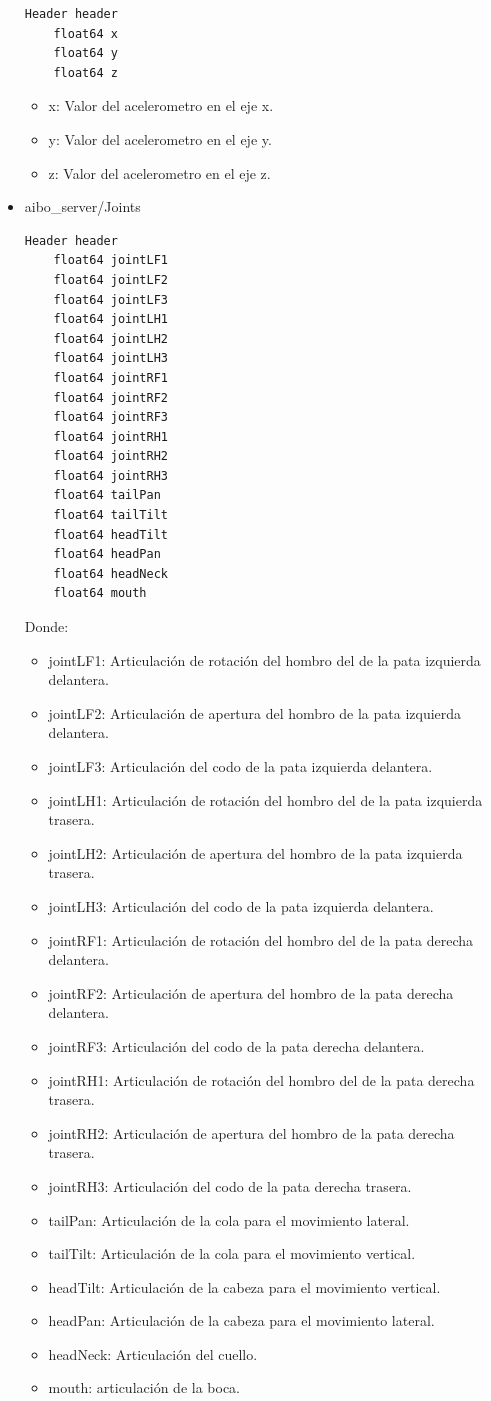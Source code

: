 \documentclass[12pt,a4paper,final,twoside]{book}
\begin{document}
\begin{itemize}
\begin{lstlisting}[language=bash]
	Header header
	float64 x
	float64 y
	float64 z
\end{lstlisting}
\begin{itemize}
\item x: Valor del acelerometro en el eje x.
\item y: Valor del acelerometro en el eje y.
\item z: Valor del acelerometro en el eje z.
\end{itemize}

\item aibo{\_}server/Joints
\begin{lstlisting}[language=bash]
	Header header
	float64 jointLF1
	float64 jointLF2     
	float64 jointLF3     
	float64 jointLH1     
	float64 jointLH2 
	float64 jointLH3 
	float64 jointRF1
	float64 jointRF2
	float64 jointRF3
	float64 jointRH1
	float64 jointRH2
	float64 jointRH3
	float64 tailPan
	float64 tailTilt
	float64 headTilt
	float64 headPan
	float64 headNeck
	float64 mouth

\end{lstlisting}

Donde:
\begin{itemize}
\item jointLF1: Articulación de rotación del hombro del de la pata izquierda delantera.
\item jointLF2: Articulación de apertura del hombro de la pata izquierda delantera.
\item jointLF3: Articulación del codo de la pata izquierda delantera.  
\item jointLH1: Articulación de rotación del hombro del de la pata izquierda trasera.     
\item jointLH2: Articulación de apertura del hombro de la pata izquierda trasera.
\item jointLH3: Articulación del codo de la pata izquierda delantera.
\item jointRF1: Articulación de rotación del hombro del de la pata derecha delantera.
\item jointRF2: Articulación de apertura del hombro de la pata derecha delantera.
\item jointRF3: Articulación del codo de la pata derecha delantera.
\item jointRH1: Articulación de rotación del hombro del de la pata derecha trasera.
\item jointRH2: Articulación de apertura del hombro de la pata derecha trasera.
\item jointRH3: Articulación del codo de la pata derecha trasera.
\item tailPan: Articulación de la cola para el movimiento lateral.
\item tailTilt: Articulación de la cola para el movimiento vertical.
\item headTilt: Articulación de la cabeza para el movimiento vertical.
\item headPan: Articulación de la cabeza para el movimiento lateral.
\item headNeck: Articulación del cuello.
\item mouth: articulación de la boca.


\end{itemize}
\end{itemize}
\end{document}
